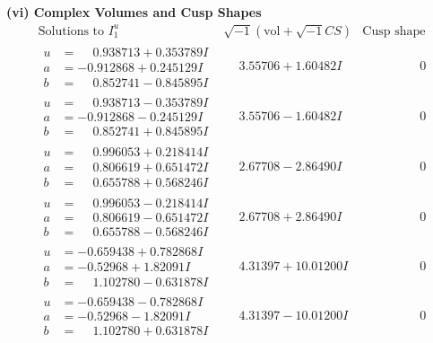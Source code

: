 \documentclass[1p]{elsarticle_modified}
\theoremstyle{definition}
\newcommand{\I}{\sqrt{-1}}
\begin{document}
\newpage\flushleft \textbf{(vi) Complex Volumes and Cusp Shapes}
$$\begin{array}{c|c|c}  
\text{Solutions to }I^u_{1}& \I (\text{vol} + \sqrt{-1}CS) & \text{Cusp shape}\\
 \hline 
\begin{aligned}
u &= \phantom{-}0.938713 + 0.353789 I \\
a &= -0.912868 + 0.245129 I \\
b &= \phantom{-}0.852741 - 0.845895 I\end{aligned}
 & \phantom{-}3.55706 + 1.60482 I & \phantom{-0.000000 } 0 \\ \hline\begin{aligned}
u &= \phantom{-}0.938713 - 0.353789 I \\
a &= -0.912868 - 0.245129 I \\
b &= \phantom{-}0.852741 + 0.845895 I\end{aligned}
 & \phantom{-}3.55706 - 1.60482 I & \phantom{-0.000000 } 0 \\ \hline\begin{aligned}
u &= \phantom{-}0.996053 + 0.218414 I \\
a &= \phantom{-}0.806619 + 0.651472 I \\
b &= \phantom{-}0.655788 + 0.568246 I\end{aligned}
 & \phantom{-}2.67708 - 2.86490 I & \phantom{-0.000000 } 0 \\ \hline\begin{aligned}
u &= \phantom{-}0.996053 - 0.218414 I \\
a &= \phantom{-}0.806619 - 0.651472 I \\
b &= \phantom{-}0.655788 - 0.568246 I\end{aligned}
 & \phantom{-}2.67708 + 2.86490 I & \phantom{-0.000000 } 0 \\ \hline\begin{aligned}
u &= -0.659438 + 0.782868 I \\
a &= -0.52968 + 1.82091 I \\
b &= \phantom{-}1.102780 - 0.631878 I\end{aligned}
 & \phantom{-}4.31397 + 10.01200 I & \phantom{-0.000000 } 0 \\ \hline\begin{aligned}
u &= -0.659438 - 0.782868 I \\
a &= -0.52968 - 1.82091 I \\
b &= \phantom{-}1.102780 + 0.631878 I\end{aligned}
 & \phantom{-}4.31397 - 10.01200 I & \phantom{-0.000000 } 0 \\ \hline\begin{aligned}

\end{aligned}
\end{array}$$
\end{document}
